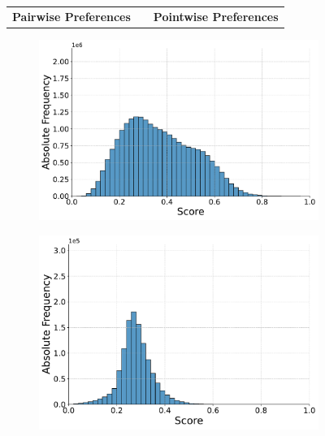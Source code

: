 \begin{figure}[t!]
    \centering
    \begin{tabular}{ccc}
        \textbf{Pairwise Preferences} & \hspace{2cm} & \textbf{Pointwise Preferences} \\
    \end{tabular}
    \footnotesize
    \begin{subfigure}[b]{0.49\textwidth}
        \centering
        \includegraphics[width=\textwidth]{graphics/seaborn/pairwise_self_score_distribution_flan-t5-base.pdf}
        \label{fig:pairwise_flan-t5-base}
    \end{subfigure}
    \hfill
    \begin{subfigure}[b]{0.49\textwidth}
        \centering
        \includegraphics[width=\textwidth]{graphics/seaborn/pointwise_self_score_distribution_flan-t5-base.pdf}
        \label{fig:pointwise_flan-t5-base}
    \end{subfigure}


\end{figure}
